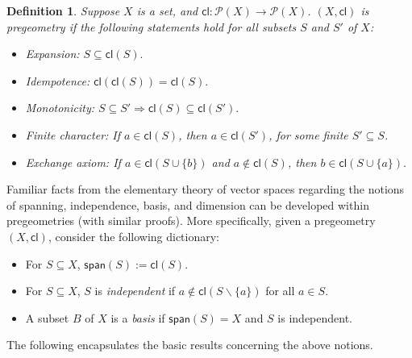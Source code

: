 \documentclass{amsart}
\newcommand{\qee} {\hspace*{2mm}\hfill \ding{109}}
\newtheorem{define}[theorem]{Definition}
\newenvironment{definition}{\begin{define} \rm}{\qee\end{define}}
\begin{document}
\begin{definition}\label{olijkesmurf} Suppose $X$ is a set, and $\mathsf{cl}:\mathcal{P}(X)\rightarrow \mathcal{P}(X)$. $(X,\mathsf{cl})$ is pregeometry if the following statements hold for all subsets $S$ and $S'$ of $X$:
    
\begin{itemize}
\item Expansion: $S\subseteq \mathsf{cl}(S).$

\item Idempotence: $\mathsf{cl}(\mathsf{cl}(S))=\mathsf{cl}(S).$

\item Monotonicity: $S\subseteq S'\Rightarrow \mathsf{cl}%
(S)\subseteq \mathsf{cl}(S').$

\item Finite character: If $a\in \mathsf{cl}(S)$, then $a\in \mathsf{cl}(S')$,
for some finite $S'\subseteq S$.

\item Exchange axiom: If $a\in \mathsf{cl}(S\cup \{b\})$ and $a\notin 
\mathsf{cl}(S)$, then $b\in \mathsf{cl}(S\cup \{a\}).$
\end{itemize}

\end{definition}
Familiar facts from the elementary theory of vector spaces regarding the
notions of spanning, independence, basis, and dimension can be developed
within pregeometries (with similar proofs). More specifically, given
a pregeometry $(X,\mathsf{cl})$,  consider the following dictionary:
 
\begin{itemize}
\item 
For $S\subseteq X$, $\mathsf{span}(S):=\mathsf{cl}(S)$.
%
\item For $S\subseteq X$, $S$ is \textit{independent} if 
$a\notin \mathsf{cl}(S\backslash \{a\})$ for all $a\in S$.
%
\item A subset $B$ of $X$ is a \textit{basis} if $\mathsf{span}(S)=X$ and $S$ is independent.
\end{itemize}

The following encapsulates the basic results concerning the above notions.
\end{document}
